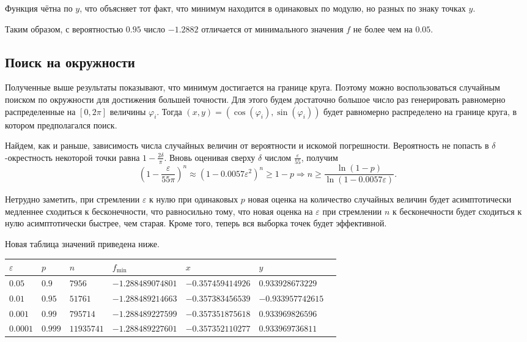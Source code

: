 \documentclass[12pt, a4paper]{article}
\begin{document}
Функция чётна по $y$, что объясняет тот факт, что минимум находится в одинаковых по модулю, но разных по знаку точках $y$.

Таким образом, с вероятностью $0.95$ число $-1.2882$ отличается от минимального значения $f$ не более чем на $0.05$.

\subsection{Поиск на окружности}
Полученные выше результаты показывают, что минимум достигается на границе круга. Поэтому можно воспользоваться случайным поиском по окружности для достижения большей точности. Для этого будем достаточно большое число раз генерировать равномерно распределенные на $\left[ 0, 2\pi \right]$ величины $\varphi_i$. Тогда $(x,y) = \left(\cos(\varphi_i),\sin\left(\varphi_i\right)\right)$ будет равномерно распределено на границе круга, в котором предполагался поиск. 

Найдем, как и раньше, зависимость числа случайных величин от вероятности и искомой погрешности. Вероятность не попасть в $\delta$-окрестность некоторой точки равна $1-\frac{2\delta}{\pi}$. Вновь оценивая сверху $\delta$ числом $\frac{\varepsilon}{55}$, получим 
 \[ \left(1-\frac{\varepsilon}{55\pi}\right)^n \approx \left( 1-0.0057\varepsilon^2 \right) ^n \geqslant 1-p \Rightarrow  n \geqslant \frac{\ln(1-p)}{\ln\left( 1-0.0057\varepsilon \right) }.\] 
 
 Нетрудно заметить, при стремлении $\varepsilon$ к нулю при одинаковых $p$ новая оценка на количество случайных величин будет асимптотически медленнее сходиться к бесконечности, что равносильно тому, что новая оценка на $\varepsilon$ при стремлении $n$ к бесконечности будет сходиться к нулю асимптотически быстрее, чем старая. Кроме того, теперь вся выборка точек будет эффективной.

Новая таблица значений приведена ниже.

\begin{tabular}{|l|l|l|l|l|l|l|}
\hline
$\varepsilon$ & $p$ & $n$ & $f_{\min}$ &$x$& $y$ \\
\hline
$0.05$ & $0.9$ & $7956$ & $-1.288489074801$ & $-0.357459414926$ & $0.933928673229$ \\
$0.01$ & $0.95$ & $51761$ & $-1.288489214663$ & $-0.357383456539$ & $-0.933957742615$ \\
$0.001$ & $0.99$ & $795714$ & $-1.288489227599$ & $-0.357351875618$ & $0.933969826596$ \\
$0.0001$ & $0.999$ & $11935741$ & $-1.288489227601$ & $-0.357352110277$ & $0.933969736811$ \\
\hline
\end{tabular}
\end{document}
